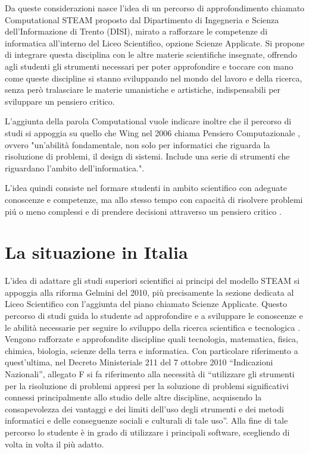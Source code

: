 Da queste considerazioni nasce l’idea di un percorso di approfondimento chiamato Computational STEAM proposto dal Dipartimento di Ingegneria e Scienza dell'Informazione di Trento (DISI), mirato a rafforzare le competenze di informatica all’interno del Liceo Scientifico, opzione Scienze Applicate. Si propone di integrare questa disciplina con le altre materie scientifiche insegnate, offrendo agli studenti gli strumenti necessari per poter approfondire e toccare con mano come queste discipline si stanno sviluppando nel mondo del lavoro e della ricerca, senza però tralasciare le materie umanistiche e artistiche, indispensabili per sviluppare un pensiero critico.

L'aggiunta della parola Computational vuole indicare inoltre che il percorso di studi si appoggia su quello che Wing nel 2006 chiama Pensiero Computazionale \cite{wing}, ovvero "un'abilità fondamentale, non solo per informatici che riguarda la risoluzione di problemi, il design di sistemi. Include una serie di strumenti che riguardano l'ambito dell'informatica.". 

L'idea quindi consiste nel formare studenti in ambito scientifico con adeguate conoscenze e competenze, ma allo stesso tempo con capacità di risolvere problemi piú o meno complessi e di prendere decisioni attraverso un pensiero critico \cite{ct_to_stem}.


\section{La situazione in Italia}
\label{sec:italia}
L’idea di adattare gli studi superiori scientifici ai principi del modello STEAM si appoggia alla riforma Gelmini del 2010, più precisamente la sezione dedicata al Liceo Scientifico con l’aggiunta del piano chiamato Scienze Applicate. Questo percorso di studi guida lo studente ad approfondire e a sviluppare le conoscenze e le abilità necessarie per seguire lo sviluppo della ricerca scientifica e tecnologica \cite{scienze_applicate}. Vengono rafforzate e approfondite discipline quali tecnologia, matematica, fisica, chimica, biologia, scienze della terra e informatica. Con particolare riferimento a quest’ultima, nel Decreto Ministeriale 211 del 7 ottobre 2010 “Indicazioni Nazionali”, allegato F \cite{riforma} si fa riferimento alla necessità di “utilizzare gli strumenti per la risoluzione di problemi appresi per la soluzione di problemi significativi connessi principalmente allo studio delle altre discipline, acquisendo la consapevolezza dei vantaggi e dei limiti dell’uso degli strumenti e dei metodi informatici e delle conseguenze sociali e culturali di tale uso”. Alla fine di tale percorso lo studente è in grado di utilizzare i principali software, scegliendo di volta in volta il più adatto.

